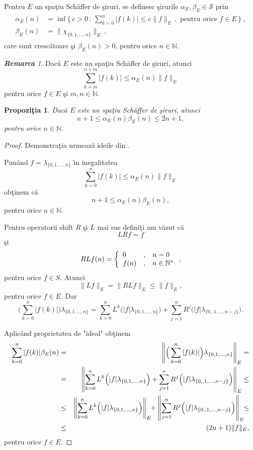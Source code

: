 \documentclass[ a4paper, 12pt]{report}
\newcommand{\N}{\mathbb{N}}
\newtheorem{prop}[theorem]{\bf Propozi\c tia }
\theoremstyle{definition}
\theoremstyle{remark}
\newtheorem{remarc}{\bf Remarca}[section]
\numberwithin{equation}{section}
\begin{document}
\medskip

Pentru $E$ un spa\c tiu Sch\"{a}ffer de \c siruri, se definesc \c sirurile $\alpha_{E}, \beta_{E} \in \mathcal{S}$ prin
\begin{gather*}
\begin{split}
\alpha_{E}(n)&=\inf\Big\{\,c>0\,:\, \sum_{k=0}^n|f(k)|\leq c\|f\|_{E}\,,\text{ pentru orice }f\in E\,\Big\}\ ,\\
\beta_{E}(n)&=\|\chi_{\{0,1,...,n\}}\|_{E}\ ,
\end{split}
\end{gather*}
care sunt cresc\u atoare \c si $\beta_{E}(n)>0$, pentru orice $n\in\N$.

\begin{remarc}
Dac\u a $E$ este un spa\c tiu Sch\"{a}ffer de \c siruri, atunci
$$\sum_{k=m}^{n + m}|f(k)|\leq \alpha_{E}(n)\|f\|_{E} $$
pentru orice $f\in E$ \c si  $m, n\in\N$.
\end{remarc}

\begin{prop}
\label{artC:twoinequals}
Dac\u a $E$ este un spa\c tiu Sch\"{a}ffer de \c siruri, atunci
$$n+1\leq \alpha_{E}(n)\beta_{E}(n)\leq 2n+1,$$ pentru orice $n\in\N$.
\end{prop}

\begin{proof} Demonstra\c tia urmeaz\u a ideile din \cite[Prop.~2.1]{PredaPoganDCDIS05}.

Pun\^ and $f = \lambda_{\{0, 1, \ldots, n\}}$ \^\i n inegalitatea
$$\sum_{k=0}^n|f(k)|\leq \alpha_{E}(n)\|f\|_{E} $$
ob\c tinem c\u a
$$n + 1 \leq \alpha_{E}(n)\beta_{E}(n),$$ pentru orice $n \in \mathbb{N}$.

Pentru operatorii shift $R$ \c si $L$ mai sus defini\c ti am v\u azut c\u a
$$LRf=f$$ \c si
$$RLf(n)= \left\{ \begin{array}{lcl} 0&,& n = 0 \cr f(n) &,& n\in\N^*\end{array}\right.,$$ pentru orice $f\in S$. Atunci
$$\|L f\|_{E} = \|R L f\|_E \leq \|f\|_E,$$ pentru orice $f \in E$. Dar
$$\Big(\sum\limits_{k = 0}^n |f(k)|\Big) \lambda_{\{ 0, 1, \ldots, n\}} = \sum\limits_{k = 0}^n L^k\Big(|f|\lambda_{\{ 0, 1, \ldots, n\}}\Big) + \sum\limits_{j = 1}^n R^j \Big(|f|\lambda_{\{ 0,. 1, \ldots, n - j\}}\Big).$$

Aplic\^ and proprietatea de "ideal" ob\c tinem
\begin{eqnarray*}
\sum\limits_{k = 0}^n |f(k)| \beta_E (n) &=& \left\|\Big(\sum\limits_{k = 0}^n |f(k)|\Big) \lambda_{\{ 0, 1, \ldots, n\}}\right\|_E = \\
&=&\left\|\sum\limits_{k = 0}^n L^k\Big(|f|\lambda_{\{ 0, 1, \ldots, n\}}\Big) + \sum\limits_{j = 1}^n R^j\Big(|f|\lambda_{\{ 0,. 1, \ldots, n - j\}}\Big)\right\|_E \leq \cr
&\leq&\left\|\sum\limits_{k = 0}^n L^k\Big(|f|\lambda_{\{ 0, 1, \ldots, n\}}\Big)\right\|_E\!\!+ \left\|\sum\limits_{j = 1}^n R^j\Big(|f|\lambda_{\{ 0,. 1, \ldots, n - j\}}\Big)\right\|_E\!\! \leq \\
&\leq& (2n + 1) \| f\|_E,
\end{eqnarray*}
pentru orice $f \in E$.


\end{proof}
\end{document}

